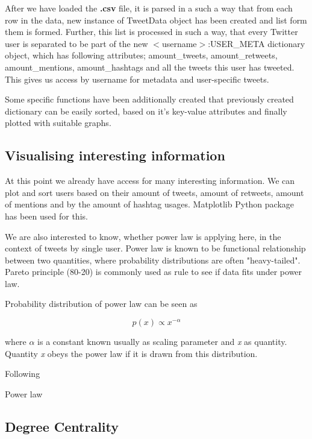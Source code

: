 \documentclass[conference]{IEEEtran}
\begin{document}
After we have loaded the \textbf{.csv} file, it is parsed in a such a way that from each row in the data, new instance
of TweetData object has been created and list form them is formed.
Further, this list is processed in such a way, that every Twitter user is separated to be part of the new
$<$username$>$:USER\_META dictionary object, which has following attributes; amount\_tweets, amount\_retweets, amount\_mentions, amount\_hashtags and all the tweets this user has tweeted.
This gives us access by username for metadata and user-specific tweets.

Some specific functions have been additionally created that previously created dictionary can be easily sorted, based on it's key-value attributes and finally plotted with suitable graphs.

\subsection{Visualising interesting information}

At this point we already have access for many interesting information.
We can plot and sort users based on their amount of tweets, amount of retweets, amount of mentions and by the amount of hashtag usages.
Matplotlib Python package has been used for this.

We are also interested to know, whether power law is applying here, in the context of tweets by single user.
Power law is known to be functional relationship between two quantities, where probability distributions are often "heavy-tailed".
Pareto principle (80-20) is commonly used as rule to see if data fits under power law\cite{enwiki:1023956740}.

Probability distribution of power law can be seen as

 \begin{equation}
 p(x) \propto x^{-\alpha}\label{eq:equation1}
 \end{equation}

where $\alpha$ is a constant known usually as scaling parameter and \textit{x} as quantity.
Quantity \textit{x} obeys the power law if it is drawn from this distribution.\cite{doi:10.1137/070710111}

Following



Power law

\subsection{Degree Centrality}
\end{document}
